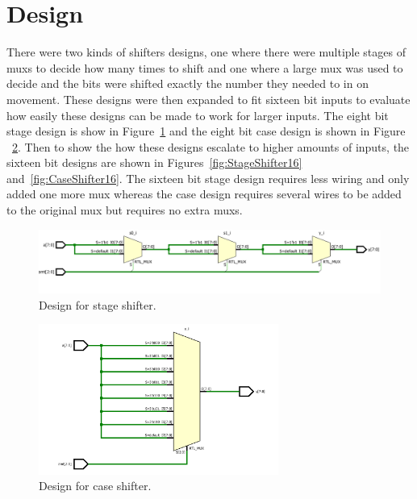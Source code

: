 \documentclass{article}\usepackage{graphicx} %
\begin{document}
\section{Design}
There were two kinds of shifters designs, one where there were multiple stages of muxs to decide how many times to shift and one where a large mux was used to decide and the bits were shifted exactly the number they needed to in on movement. These designs were then expanded to fit sixteen bit inputs to evaluate how easily these designs can be made to work for larger inputs. The eight bit stage design is show in Figure~\ref{fig:StageShifter} and the eight bit case design is shown in Figure ~\ref{fig:CaseShifter}. Then to show the how these designs escalate to higher amounts of inputs, the sixteen bit designs are shown in Figures~\ref{fig:StageShifter16} and~\ref{fig:CaseShifter16}. The sixteen bit stage design requires less wiring and only added one more mux whereas the case design requires several wires to be added to the original mux but requires no extra muxs.
\begin{figure}[H]
\begin{center}
	\caption{Design for stage shifter.}\label{fig:StageShifter}
	\includegraphics[width=1.2\textwidth]{../images/Shifter_stage_design.png}
\end{center}
\end{figure}
\begin{figure}[H]
\begin{center}
	\caption{Design for case shifter.}\label{fig:CaseShifter}
	\includegraphics[width=0.7\textwidth]{../images/Shifter_case_design.png}
\end{center}
\end{figure}
\end{document}
